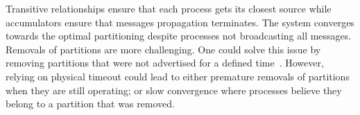 Transitive relationships ensure that each process gets its closest
source while accumulators ensure that messages propagation
terminates. The system converges towards the optimal partitioning
despite processes not broadcasting all messages. Removals of
partitions are more challenging.  One could solve this
issue by removing partitions that were not advertised for a defined
time~\REF. However, relying on physical timeout could lead to either
premature removals of partitions when they are still operating; or
slow convergence where processes believe they belong to a partition
that was removed.




